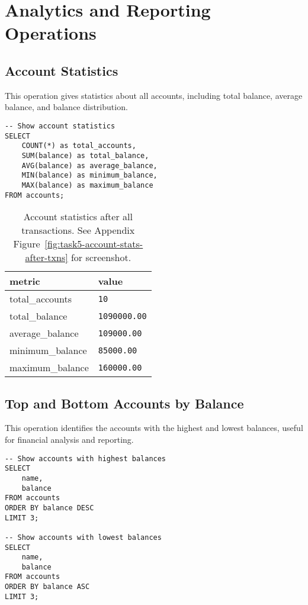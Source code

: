 \section{Analytics and Reporting Operations}

\subsection{Account Statistics}
This operation gives statistics about all accounts, including total balance, average balance, and balance distribution.

\begin{verbatim}
-- Show account statistics
SELECT
    COUNT(*) as total_accounts,
    SUM(balance) as total_balance,
    AVG(balance) as average_balance,
    MIN(balance) as minimum_balance,
    MAX(balance) as maximum_balance
FROM accounts;
\end{verbatim}

\begin{table}[H]
  \centering
  \begin{tabular}{|l|l|}
    \hline
    \textbf{metric} & \textbf{value} \\
    \hline
    total\_accounts & \texttt{10} \\
    total\_balance & \texttt{1090000.00} \\
    average\_balance & \texttt{109000.00} \\
    minimum\_balance & \texttt{85000.00} \\
    maximum\_balance & \texttt{160000.00} \\
    \hline
  \end{tabular}
  \caption{Account statistics after all transactions. See Appendix Figure~\ref{fig:task5-account-stats-after-txns} for screenshot.}
\end{table}

\subsection{Top and Bottom Accounts by Balance}
This operation identifies the accounts with the highest and lowest balances, useful for financial analysis and reporting.

\begin{verbatim}
-- Show accounts with highest balances
SELECT
    name,
    balance
FROM accounts
ORDER BY balance DESC
LIMIT 3;

-- Show accounts with lowest balances
SELECT
    name,
    balance
FROM accounts
ORDER BY balance ASC
LIMIT 3;
\end{verbatim}

